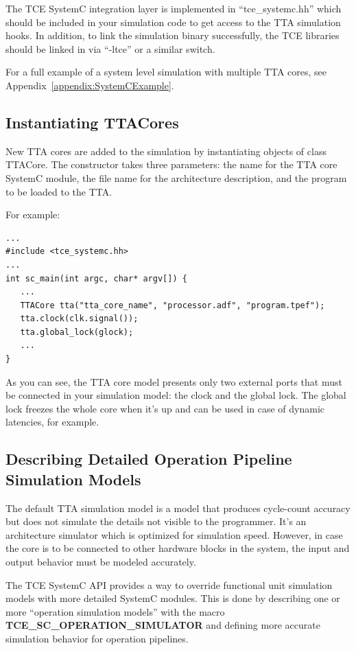 \documentclass[a4paper,twoside]{tceusermanual}
\begin{document}
The TCE SystemC integration layer is implemented in ``tce\_systemc.hh'' which 
should be included in your simulation code to get access to the TTA
simulation hooks. In addition, to link the simulation binary successfully,
the TCE libraries should be linked in via ``-ltce'' or a similar switch. 

For a full example of a system level simulation with multiple TTA cores, 
see Appendix~\ref{appendix:SystemCExample}.

\subsection{Instantiating TTACores}

New TTA cores are added to the simulation by instantiating objects of
class TTACore. The constructor takes three parameters: the name for
the TTA core SystemC module, the file name for the architecture description,
and the program to be loaded to the TTA.

For example:

\begin{verbatim}
...
#include <tce_systemc.hh>
...
int sc_main(int argc, char* argv[]) {
   ...
   TTACore tta("tta_core_name", "processor.adf", "program.tpef");
   tta.clock(clk.signal());
   tta.global_lock(glock);
   ...
}
\end{verbatim}

As you can see, the TTA core model presents only two external ports that
must be connected in your simulation model: the clock and the
global lock. The global lock freezes the whole core when
it's up and can be used in case of dynamic latencies, for example.
 
\subsection{Describing Detailed Operation Pipeline Simulation Models}

The default TTA simulation model is a model that produces cycle-count
accuracy but does not simulate the details not visible to the programmer.
It's an architecture simulator which is optimized for simulation speed. 
However, in case the core is to be connected to other hardware blocks in the
system, the input and output behavior must be modeled accurately. 

The TCE SystemC API provides a way to override functional unit simulation
models with more detailed SystemC modules. This is done by describing
one or more ``operation simulation models'' with the macro
\textbf{TCE\_SC\_OPERATION\_SIMULATOR} and defining more accurate
simulation behavior for operation pipelines.
\end{document}

